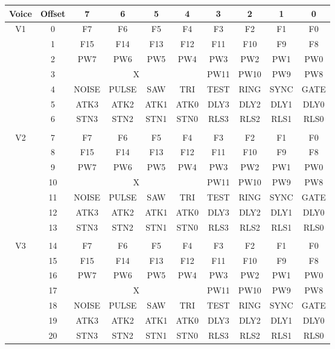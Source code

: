 \begin{table}
	\begin{center}
		\begin{tabular}{|c|c|c|c|c|c|c|c|c|c|} \hline
			Voice & Offset & 7 & 6 & 5 & 4 & 3 & 2 & 1 & 0 \\ \hline\hline
            \multirow{7}{*}{V1} & 0 & F7 & F6 & F5 & F4 & F3 & F2 & F1 & F0 \\ \cline{2-10}
            & 1 & F15 & F14 & F13 & F12 & F11 & F10 & F9 & F8 \\ \cline{2-10}
            & 2 & PW7 & PW6 & PW5 & PW4 & PW3 & PW2 & PW1 & PW0 \\ \cline{2-10}
            & 3 & \multicolumn{4}{|c|}{X} & PW11 & PW10 & PW9 & PW8 \\ \cline{2-10}
            & 4 & NOISE & PULSE & SAW & TRI & TEST & RING & SYNC & GATE \\ \cline{2-10}
            & 5 & ATK3 & ATK2 & ATK1 & ATK0 & DLY3 & DLY2 & DLY1 & DLY0 \\ \cline{2-10}
            & 6 & STN3 & STN2 & STN1 & STN0 & RLS3 & RLS2 & RLS1 & RLS0 \\ \hline

            \multicolumn{10}{c}{} \\ \hline

            \multirow{7}{*}{V2} & 7 & F7 & F6 & F5 & F4 & F3 & F2 & F1 & F0\\ \cline{2-10}
            & 8 & F15 & F14 & F13 & F12 & F11 & F10 & F9 & F8 \\ \cline{2-10}
            & 9 & PW7 & PW6 & PW5 & PW4 & PW3 & PW2 & PW1 & PW0 \\ \cline{2-10}
            & 10 & \multicolumn{4}{|c|}{X} & PW11 & PW10 & PW9 & PW8 \\ \cline{2-10}
            & 11 & NOISE & PULSE & SAW & TRI & TEST & RING & SYNC & GATE \\ \cline{2-10}
            & 12 & ATK3 & ATK2 & ATK1 & ATK0 & DLY3 & DLY2 & DLY1 & DLY0 \\ \cline{2-10}
            & 13 & STN3 & STN2 & STN1 & STN0 & RLS3 & RLS2 & RLS1 & RLS0 \\ \hline

            \multicolumn{10}{c}{} \\ \hline

            \multirow{7}{*}{V3} & 14 & F7 & F6 & F5 & F4 & F3 & F2 & F1 & F0 \\ \cline{2-10}
            & 15 & F15 & F14 & F13 & F12 & F11 & F10 & F9 & F8 \\ \cline{2-10}
            & 16 & PW7 & PW6 & PW5 & PW4 & PW3 & PW2 & PW1 & PW0 \\ \cline{2-10}
            & 17 & \multicolumn{4}{|c|}{X} & PW11 & PW10 & PW9 & PW8 \\ \cline{2-10}
            & 18 & NOISE & PULSE & SAW & TRI & TEST & RING & SYNC & GATE \\ \cline{2-10}
            & 19 & ATK3 & ATK2 & ATK1 & ATK0 & DLY3 & DLY2 & DLY1 & DLY0 \\ \cline{2-10}
            & 20 & STN3 & STN2 & STN1 & STN0 & RLS3 & RLS2 & RLS1 & RLS0 \\ \hline


\end{tabular}
\end{center}
\end{table}
